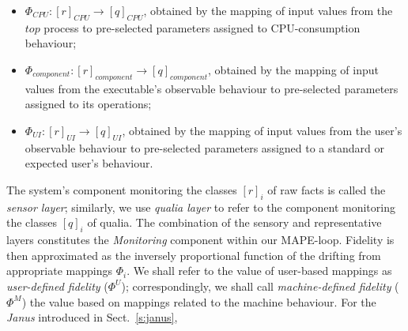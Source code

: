 \documentclass{article}
\begin{document}
\begin{itemize}
\item $\Phi_{CPU}: [r]_{CPU} \to [q]_{CPU}$, obtained by the mapping of input values from the $top$ process to pre-selected parameters assigned to CPU-consumption behaviour;
\item $\Phi_{component}: [r]_{component} \to [q]_{component}$, obtained by the mapping of input values from the executable's observable behaviour to pre-selected parameters assigned to its operations;
\item $\Phi_{UI}: [r]_{UI} \to [q]_{UI}$, obtained by the mapping of input values from  the user's observable behaviour to pre-selected parameters assigned to a standard or expected user's behaviour.
\end{itemize}
The system's component monitoring the classes $[r]_{i}$ of raw facts is called the \textit{sensor layer}; similarly, we use \textit{qualia layer} to refer to the component monitoring the classes $[q]_{i}$ of qualia. The combination of the sensory and representative layers constitutes the \textit{Monitoring} component within our MAPE-loop. Fidelity is then approximated as the inversely proportional function of the drifting from appropriate mappings $\Phi_{i}$. We shall refer to the value of user-based mappings as \textit{user-defined fidelity} ($\Phi^{U}$); correspondingly, we shall call \textit{machine-defined fidelity} ($\Phi^{M}$) the value based on mappings related to the machine behaviour. For the \textit{Janus} introduced in Sect.~\ref{s:janus}, 
\end{document}
